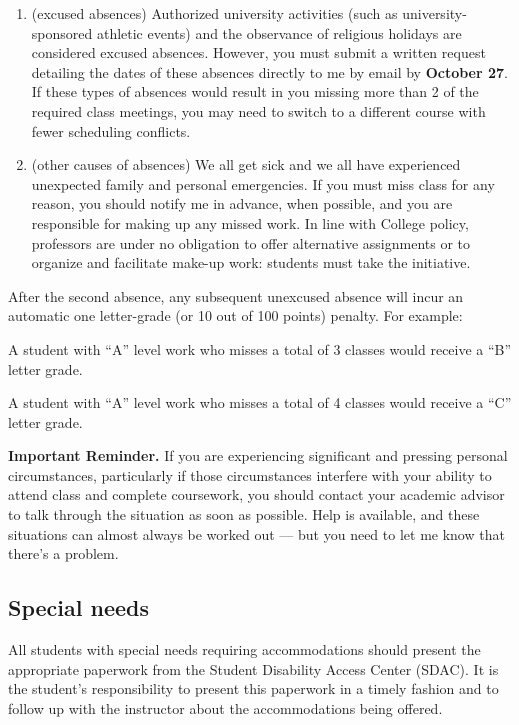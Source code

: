 \documentclass[oneside,11pt]{amsart}
\begin{document}
\begin{enumerate}[$\bullet$]
    \item (excused absences) Authorized university activities (such as university-sponsored athletic events) and the observance of religious holidays are considered excused absences. However, you must submit a written request detailing the dates of these absences directly to me by email by \textbf{October 27}. If these types of absences would result in you missing more than 2 of the required class meetings, you may need to switch to a different course with fewer scheduling conflicts.
    \item (other causes of absences)
		We all get sick and we all have experienced unexpected family and personal emergencies. If you must miss class for any reason, you should notify me in advance, when possible, and you are responsible for making up any missed work. In line with College policy, professors are under no obligation to offer alternative assignments or to organize and facilitate make-up work: students must take the initiative.
\end{enumerate}

After the second absence, any subsequent unexcused absence will incur an automatic one letter-grade (or 10 out of 100 points) penalty. For example:
\begin{compactitem}
\item A student with ``A'' level work who misses a total of 3 classes would receive a ``B'' letter grade.
\item A student with ``A'' level work who misses a total of 4 classes would receive a ``C'' letter grade.
\end{compactitem}

\medskip\noindent
\textbf{Important Reminder.}
If you are experiencing significant and pressing personal circumstances, particularly if those circumstances interfere with your ability to attend class and complete coursework, you should contact your academic advisor to talk through the situation as soon as possible. Help is available, and these situations can almost always be worked out --- but you need to let me know that there's a problem.



\subsection{Special needs}

All students with special needs requiring accommodations should present the appropriate paperwork from the Student Disability Access Center (SDAC). It is the student's responsibility to present this paperwork in a timely fashion and to follow up with the instructor about the accommodations being offered.
%
\end{document}
